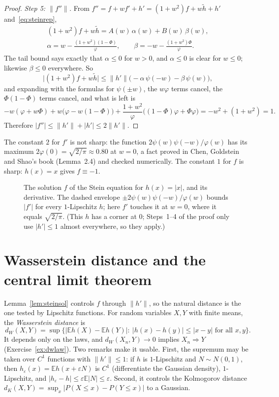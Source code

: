 \begin{proof}
\emph{Step 5: $\|f''\|$.} From $f''=f+wf'+h'=(1+w^2)f+w\tilde h+h'$ and~\eqref{eq:steinrep},
\[
\begin{gathered}
(1+w^2)f+w\tilde h=A(w)\,\alpha(w)+B(w)\,\beta(w),\\
\alpha=w-\frac{(1+w^2)(1-\Phi)}{\varphi},\qquad\beta=-w-\frac{(1+w^2)\Phi}\varphi.
\end{gathered}
\]
The tail bound says exactly that $\alpha\le0$ for $w>0$, and $\alpha\le0$ is clear for $w\le0$; likewise $\beta\le0$ everywhere. So
\[
\bigl|(1+w^2)f+w\tilde h\bigr|\le\|h'\|\bigl(-\alpha\,\psi(-w)-\beta\,\psi(w)\bigr),
\]
and expanding with the formulas for $\psi(\pm w)$, the $w\varphi$ terms cancel, the $\Phi(1-\Phi)$ terms cancel, and what is left is
\[
-w(\varphi+w\Phi)+w\bigl(\varphi-w(1-\Phi)\bigr)+\frac{1+w^2}{\varphi}\bigl((1-\Phi)\varphi+\Phi\varphi\bigr)=-w^2+(1+w^2)=1.
\]
Therefore $|f''|\le\|h'\|+|h'|\le2\|h'\|$.
\end{proof}

The constant $2$ for $f'$ is not sharp: the function $2\psi(w)\psi(-w)/\varphi(w)$ has its maximum $2\varphi(0)=\sqrt{2/\pi}\approx0.80$ at $w=0$, a fact proved
in Chen, Goldstein and Shao's book (Lemma~2.4) and checked numerically. The constant $1$ for $f$ is sharp: $h(x)=x$ gives $f\equiv-1$.

\begin{figure}[ht]
\centering{}
\caption{The solution $f$ of the Stein equation for $h(x)=|x|$, and its derivative. The dashed envelope $\pm2\psi(w)\psi(-w)/\varphi(w)$ bounds $|f'|$ for every
$1$-Lipschitz $h$; here $f'$ touches it at $w=0$, where it equals $\sqrt{2/\pi}$. (This $h$ has a corner at $0$; Steps~1--4 of the proof only use $|h'|\le1$ almost everywhere, so they apply.)}
\label{fig:steinsol}
\end{figure}

\section{Wasserstein distance and the central limit theorem}

Lemma~\ref{lem:steinsol} controls $f$ through $\|h'\|$, so the natural distance is the one tested by Lipschitz functions. For random variables $X,Y$ with
finite means, the \emph{Wasserstein distance} is
\[
d_W(X,Y)=\sup\bigl\{|\mathbb Eh(X)-\mathbb Eh(Y)|:\ |h(x)-h(y)|\le|x-y|\text{ for all }x,y\bigr\}.
\]
It depends only on the laws, and $d_W(X_n,Y)\to0$ implies $X_n\Rightarrow Y$ (Exercise~\ref{ex:dwlaw}). Two remarks make it usable. First, the supremum may be taken
over $C^1$ functions with $\|h'\|\le1$: if $h$ is $1$-Lipschitz and $N\sim N(0,1)$, then $h_\varepsilon(x)=\mathbb Eh(x+\varepsilon N)$ is $C^1$ (differentiate the Gaussian
density), $1$-Lipschitz, and $|h_\varepsilon-h|\le\varepsilon\mathbb E|N|\le\varepsilon$. Second, it controls the Kolmogorov distance
$d_K(X,Y)=\sup_x|P(X\le x)-P(Y\le x)|$ to a Gaussian.

